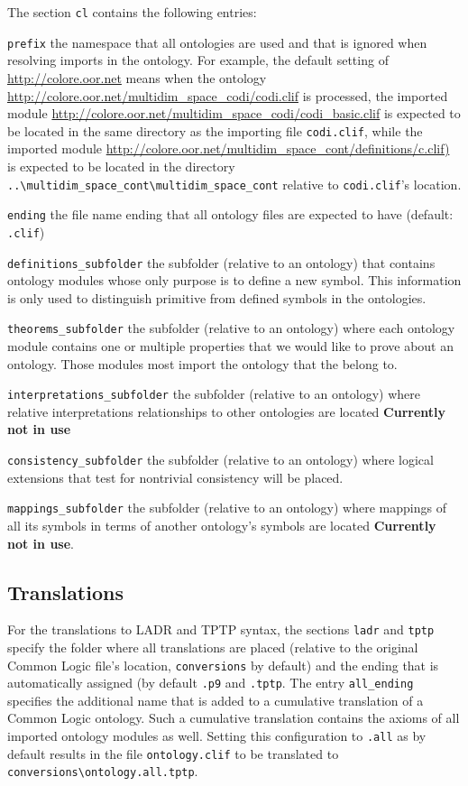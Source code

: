 \documentclass{article}
\begin{document}
The section \texttt{cl} contains the following entries:

\begin{description}
\item \texttt{prefix} the namespace that all ontologies are used and that is ignored when resolving imports in the ontology. For example, the default setting of \url{http://colore.oor.net} means when the ontology \url{http://colore.oor.net/multidim\_space\_codi/codi.clif}  is processed, the imported module \url{http://colore.oor.net/multidim\_space\_codi/codi\_basic.clif} is expected to be located in the same directory as the importing file \texttt{codi.clif}, while the imported module \url{http://colore.oor.net/multidim\_space\_cont/definitions/c.clif)} is expected to be located in the directory \texttt{..\textbackslash multidim\_space\_cont\textbackslash multidim\_space\_cont} relative to \texttt{codi.clif}'s location.
\item \texttt{ending} the file name  ending that all ontology files are expected to have (default: \texttt{.clif})
\item \texttt{definitions\_subfolder} the subfolder (relative to an ontology) that contains ontology modules whose only purpose is to define a new symbol. This information is only used to distinguish primitive from defined symbols in the ontologies. 
\item \texttt{theorems\_subfolder}  the subfolder (relative to an ontology) where each ontology module contains one or multiple properties that we would like to prove about an ontology. Those modules most import the ontology that the belong to. 
\item \texttt{interpretations\_subfolder} the subfolder (relative to an ontology) where relative interpretations relationships to other ontologies are located  \textbf{Currently not in use}
\item \texttt{consistency\_subfolder} the subfolder (relative to an ontology) where logical extensions that test for nontrivial consistency will be placed. 
\item \texttt{mappings\_subfolder} the subfolder (relative to an ontology) where mappings of all its symbols in terms of another ontology's symbols are located \textbf{Currently not in use}.
\end{description}


\subsection{Translations}
For the translations to LADR and TPTP syntax, the sections \texttt{ladr} and \texttt{tptp} specify the folder where all translations are placed (relative to the original Common Logic file's location, \texttt{conversions} by default) and the ending that is automatically assigned (by default \texttt{.p9} and \texttt{.tptp}. The entry \texttt{all\_ending} specifies the additional name that is added to a cumulative translation of a Common Logic ontology. Such a cumulative translation contains the axioms of all imported ontology modules as well. Setting this configuration to \texttt{.all} as by default results in the file \texttt{ontology.clif} to be translated to \texttt{conversions\textbackslash ontology.all.tptp}.
\end{document}
